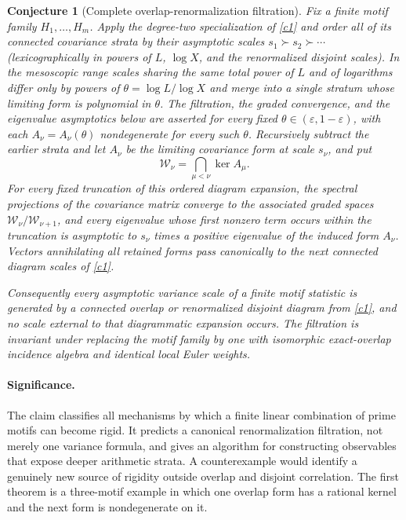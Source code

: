 \documentclass[11pt]{article}
\newtheorem{conjecture}{Conjecture}
\newcommand{\eps}{\varepsilon}
\begin{document}
\begin{conjecture}[Complete overlap-renormalization filtration]\label{c2}
Fix a finite motif family $H_1,\ldots,H_m$.  Apply the degree-two specialization of
\cref{c1} and order all of its connected covariance strata by their asymptotic scales
$s_1\succ s_2\succ\cdots$ (lexicographically in powers of $L$, $\log X$, and the
renormalized disjoint scales).  In the mesoscopic range scales sharing the same total
power of $L$ and of logarithms differ only by powers of $\theta=\log L/\log X$ and
merge into a single stratum whose limiting form is polynomial in $\theta$.  The
filtration, the graded convergence, and the eigenvalue asymptotics below are asserted
for every fixed $\theta\in(\eps,1-\eps)$, with each $A_\nu=A_\nu(\theta)$
nondegenerate for every such $\theta$.  Recursively subtract the earlier strata and let $A_\nu$
be the limiting covariance form at scale $s_\nu$, and put
\[
 \mathcal W_\nu=\bigcap_{\mu<\nu}\ker A_\mu.
\]
For every fixed truncation of this ordered diagram expansion, the spectral projections
of the covariance matrix converge to the associated graded spaces
$\mathcal W_\nu/\mathcal W_{\nu+1}$, and every eigenvalue whose first nonzero term occurs
within the truncation is asymptotic to $s_\nu$ times a positive eigenvalue of the induced
form $A_\nu$.  Vectors annihilating all retained forms pass canonically to the next
connected diagram scales of \cref{c1}.

Consequently every asymptotic variance scale of a finite motif statistic is generated by
a connected overlap or renormalized disjoint diagram from \cref{c1}, and no scale
external to that diagrammatic expansion occurs.  The filtration is invariant under replacing the
motif family by one with isomorphic exact-overlap incidence algebra and identical local
Euler weights.
\end{conjecture}

\paragraph{Significance.}
The claim classifies all mechanisms by which a finite linear combination of prime motifs
can become rigid.  It predicts a canonical renormalization filtration, not merely one
variance formula, and gives an algorithm for constructing observables that expose deeper
arithmetic strata.  A counterexample would identify a genuinely new source of rigidity
outside overlap and disjoint correlation.  The first theorem is a three-motif example in
which one overlap form has a rational kernel and the next form is nondegenerate on it.
\end{document}
